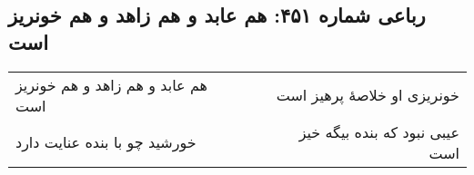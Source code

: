\begin{center}
\section*{رباعی شماره ۴۵۱: هم عابد و هم زاهد و هم خونریز است}
\label{sec:0451}
\begin{longtable}{l p{0.5cm} r}
هم عابد و هم زاهد و هم خونریز است
&&
خونریزی او خلاصهٔ پرهیز است
\\
خورشید چو با بنده عنایت دارد
&&
عیبی نبود که بنده بیگه خیز است
\\
\end{longtable}
\end{center}
